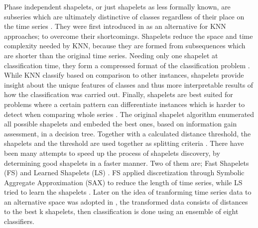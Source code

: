 Phase independent shapelets, or just shapelets as less formally known,
are subseries which are ultimately distinctive of classes regardless of their place on the time series \cite{schafer2017fast,bagnall2017great}.
They were first introduced in \cite{ye2009time} as an alternative for KNN approaches; to overcome their shortcomings.\newline
Shapelets reduce the space and time complexity needed by KNN, because they are formed from subsequences which are shorter than
the original time series. Needing only one shapelet at classification time, they form a compressed format of the classification problem \cite{bostrom2017shapelet,ye2009time,mueen2011logical}.
While KNN classify based on comparison to other instances, shapelets provide insight about the unique features of classes and thus more
interpretable results of how the classification was carried out.
Finally, shapelets are best suited for problems where a certain pattern can differentiate instances which is harder to detect when comparing whole series \cite{bagnall2017great,Bostrom2017}.\newline
The original shapelet algorithm enumerated all possible shapelets and embeded the best ones, based on information gain assessment, in a decision tree.
Together with a calculated distance threshold, the shapelets and the threshold are used together as splitting criteria \cite{lines2018time,schafer2015boss}.
There have been many attempts to speed up the process of shapelets discovery, by determining good shapelets in a faster manner.
Two of them are; Fast Shapelets (FS) \cite{rakthanmanon2013fast} and Learned Shapelets (LS) \cite{grabocka2014learning}.
FS applied discretization through Symbolic Aggregate Approximation (SAX) to reduce the length of time series,
while LS tried to learn the shapelets \cite{shifaz2020ts}.
Later on the idea of tranforming time series data to an alternative space was adopted in \cite{hills2014classification},
the transformed data consists of distances to the best k shapelets, then classification is done using an ensemble of eight classifiers.